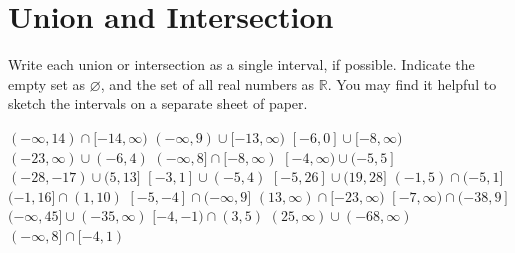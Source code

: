 \section*{Union and Intersection}
Write each union or intersection as a single interval, if possible. Indicate the empty set as $\varnothing$, and the set of all real numbers as $\mathbb{R}$. You may find it helpful to sketch the intervals on a separate sheet of paper.
\begin{smenum}
\mitemxxx
	{$(-\infty,14)\cap[-14,\infty)$}
	{$(-\infty,9)\cup[-13,\infty)$}
	{$[-6,0]\cup[-8,\infty)$}
\mitemxxx
	{$(-23,\infty)\cup(-6,4)$}
	{$(-\infty,8]\cap[-8,\infty)$}
	{$[-4,\infty)\cup(-5,5]$}
\mitemxxx
	{$(-28,-17)\cup(5,13]$}
	{$[-3,1]\cup(-5,4)$}
	{$[-5,26]\cup(19,28]$}
\mitemxxx
	{$(-1,5)\cap(-5,1]$}
	{$(-1,16]\cap(1,10)$}
	{$[-5,-4]\cap(-\infty,9]$}
\mitemxxx
	{$(13,\infty)\cap[-23,\infty)$}
	{$[-7,\infty)\cap(-38,9]$}
	{$(-\infty,45]\cup(-35,\infty)$}
\mitemxxx
	{$[-4,-1)\cap(3,5)$}
	{$(25,\infty)\cup(-68,\infty)$}
	{$(-\infty,8]\cap[-4,1)$}
\end{smenum}
